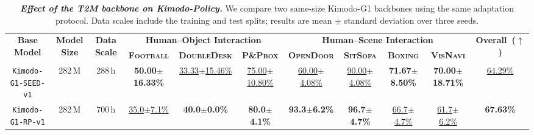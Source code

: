\begin{table}[H]
  \caption{
    \textbf{\textit{Effect of the T2M backbone on Kimodo-Policy.}} We compare two same-size Kimodo-G1 backbones using the same adaptation protocol. Data scales include the training and test splits; results are mean $\pm$ standard deviation over three seeds.}
  \label{tab:t2m_dependency}
  \centering
  \begin{adjustbox}{max width=\textwidth}
  \setlength{\tabcolsep}{3.8pt}
  \renewcommand{\arraystretch}{1.08}

  \begin{tabular}{cccccc|ccccc}
  \toprule
  \multirow{2}{*}{\textbf{Base Model}} &
  \multirow{2}{*}{\textbf{Model Size}} &
  \multirow{2}{*}{\textbf{Data Scale}} &
  \multicolumn{3}{c|}{\textbf{Human--Object Interaction}} &
  \multicolumn{4}{c}{\textbf{Human--Scene Interaction}} &
  \multirow{2}{*}{\textbf{Overall~($\uparrow$)}} \\
  \cmidrule(lr){4-6}
  \cmidrule(lr){7-10}

  & & &
  \textbf{\textsc{Football}} &
  \textbf{\textsc{DoubleDesk}} &
  \textbf{\textsc{P\&Pbox}} &
  \textbf{\textsc{OpenDoor}} &
  \textbf{\textsc{SitSofa}} &
  \textbf{\textsc{Boxing}} &
  \textbf{\textsc{VisNavi}} \\
  \midrule

  \texttt{Kimodo-G1-SEED-v1}
  & 282\,M
  & 288\,h
  & \textbf{50.00$\pm$16.33\%}
  & \underline{33.33$\pm$15.46\%}
  & \underline{75.00$\pm$10.80\%}
  & \underline{60.00$\pm$4.08\%}
  & \underline{90.00$\pm$4.08\%}
  & \textbf{71.67$\pm$8.50\%}
  & \textbf{70.00$\pm$18.71\%}
  & \underline{64.29\%} \\

  \rowcolor{hclbrown!8!white}
  \texttt{Kimodo-G1-RP-v1}
  & 282\,M
  & 700\,h
  & \underline{35.0$\pm$7.1\%}
  & \textbf{40.0$\pm$0.0\%}
  & \textbf{80.0$\pm$4.1\%}
  & \textbf{93.3$\pm$6.2\%}
  & \textbf{96.7$\pm$4.7\%}
  & \underline{66.7$\pm$4.7\%}
  & \underline{61.7$\pm$6.2\%}
  & \textbf{67.63\%} \\

  \bottomrule
  \end{tabular}
  \end{adjustbox}
\end{table}
